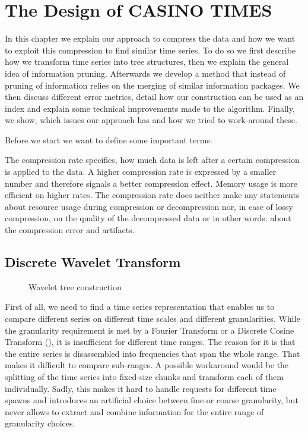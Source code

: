 \chapter{The Design of CASINO TIMES}
\label{ch:algorithm}

In this chapter we explain our approach to compress the data and how we want to exploit this compression to find similar time series. To do so we first describe how we transform time series into tree structures, then we explain the general idea of information pruning. Afterwards we develop a method that instead of pruning of information relies on the merging of similar information packages. We then discuss different error metrics, detail how our construction can be used as an index and explain some technical improvements made to the algorithm. Finally, we show, which issues our approach has and how we tried to work-around these.

Before we start we want to define some important terms:

\begin{definition}
    The compression rate specifies, how much data is left after a certain compression is applied to the data. A higher compression rate is expressed by a smaller number and therefore signals a better compression effect. Memory usage is more efficient on higher rates. The compression rate does neither make any statements about resource usage during compression or decompression nor, in case of lossy compression, on the quality of the decompressed data or in other words: about the compression error and artifacts.
\end{definition}



\section{Discrete Wavelet Transform}
\label{sec:algorithm:wavelet}

\begin{figure}
    \centering
    
    \caption{Wavelet tree construction}\label{fig:wavelet_tree_example}
\end{figure}

First of all, we need to find a time series representation that enables us to compare different series on different time scales and different granularities. While the granularity requirement is met by a Fourier Transform or a Discrete Cosine Transform (\cite{DCT1,DCT2}), it is insufficient for different time ranges. The reason for it is that the entire series is disassembled into frequencies that span the whole range. That makes it difficult to compare sub-ranges. A possible workaround would be the splitting of the time series into fixed-size chunks and transform each of them individually. Sadly, this makes it hard to handle requests for different time spawns and introduces an artificial choice between fine or coarse granularity, but never allows to extract and combine information for the entire range of granularity choices.

